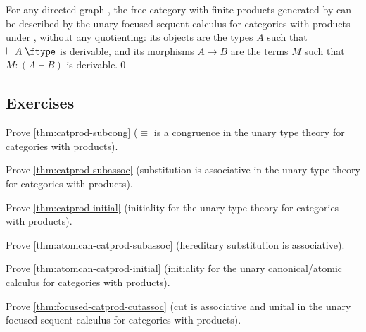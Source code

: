 \documentclass{book}
\let\types\vdash
\def\type{\;\ftype}
\begin{document}
\begin{thm}\label{thm:focused-catprod-initial}
  For any directed graph \cG, the free category with finite products generated by \cG can be described by the unary focused sequent calculus for categories with products under \cG, without any quotienting: its objects are the types $A$ such that $\types A\type$ is derivable, and its morphisms $A\to B$ are the terms $M$ such that $M:(A \types B)$ is derivable.\qed
\end{thm}




\subsection*{Exercises}

\begin{ex}\label{ex:catprod-subcong}
  Prove \cref{thm:catprod-subcong} ($\equiv$ is a congruence in the unary type theory for categories with products).
\end{ex}

\begin{ex}\label{ex:catprod-subassoc}
  Prove \cref{thm:catprod-subassoc} (substitution is associative in the unary type theory for categories with products).
\end{ex}

\begin{ex}\label{ex:catprod-initial}
  Prove \cref{thm:catprod-initial} (initiality for the unary type theory for categories with products).
\end{ex}

\begin{ex}\label{ex:atomcan-catprod-subassoc}
  Prove \cref{thm:atomcan-catprod-subassoc} (hereditary substitution is associative).
\end{ex}

\begin{ex}\label{ex:atomcan-catprod-initial}
  Prove \cref{thm:atomcan-catprod-initial} (initiality for the unary canonical/atomic calculus for categories with products).
\end{ex}

\begin{ex}\label{ex:focused-catprod-cutassoc}
  Prove \cref{thm:focused-catprod-cutassoc} (cut is associative and unital in the unary focused sequent calculus for categories with products).
\end{ex}
\end{document}
